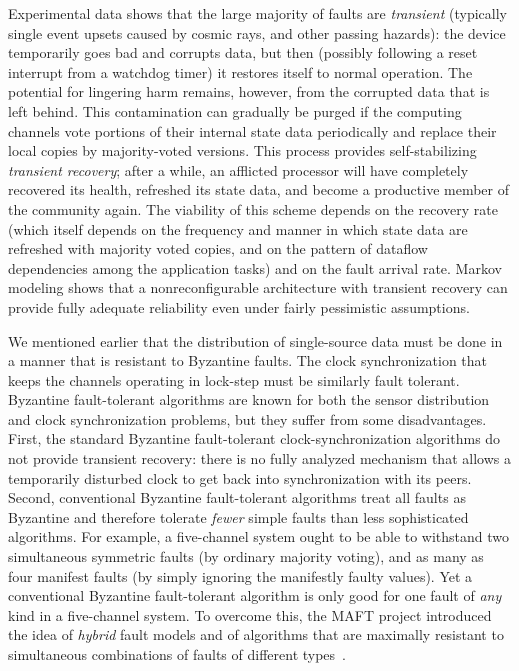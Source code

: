 Experimental data shows that the large majority of faults are {\em
transient\/} (typically single event upsets caused by cosmic rays,
and other passing hazards): the device temporarily goes bad and
corrupts data, but then (possibly following a reset interrupt from a
watchdog timer) it restores itself to normal operation.  The
potential for lingering harm remains, however, from the corrupted
data that is left behind.  This contamination can gradually be purged
if the computing channels vote portions of their internal state data
periodically and replace their local copies by majority-voted
versions.  This process provides self-stabilizing {\em transient
recovery\/}; after a while, an afflicted processor will have
completely recovered its health, refreshed its state data, and become
a productive member of the community again.  The viability of this
scheme depends on the recovery rate (which itself depends on the
frequency and manner in which state data are refreshed with majority
voted copies, and on the pattern of dataflow dependencies among the
application tasks) and on the fault arrival rate.  Markov modeling
shows that a nonreconfigurable architecture with transient recovery
can provide fully adequate reliability even under fairly pessimistic
assumptions.

We mentioned earlier that the distribution of single-source data must
be done in a manner that is resistant to Byzantine faults.  The clock
synchronization that keeps the channels operating in lock-step must
be similarly fault tolerant.  Byzantine fault-tolerant algorithms are
known for both the sensor distribution and clock synchronization
problems, but they suffer from some disadvantages.  First, the
standard Byzantine fault-tolerant clock-synchronization algorithms do
not provide transient recovery: there is no fully analyzed mechanism
that allows a temporarily disturbed clock to get back into
synchronization with its peers.  Second, conventional Byzantine
fault-tolerant algorithms treat all faults as Byzantine and therefore
tolerate {\em fewer\/} simple faults than less sophisticated
algorithms.  For example, a five-channel system ought to be able to
withstand two simultaneous symmetric faults (by ordinary majority
voting), and as many as four manifest faults (by simply ignoring the
manifestly faulty values).  Yet a conventional Byzantine
fault-tolerant algorithm is only good for one fault of {\em any} kind
in a five-channel system.  To overcome this, the MAFT project
introduced the idea of {\em hybrid\/} fault models and of algorithms
that are maximally resistant to simultaneous combinations of faults
of different types~\cite{Thambidurai-Park88}.

